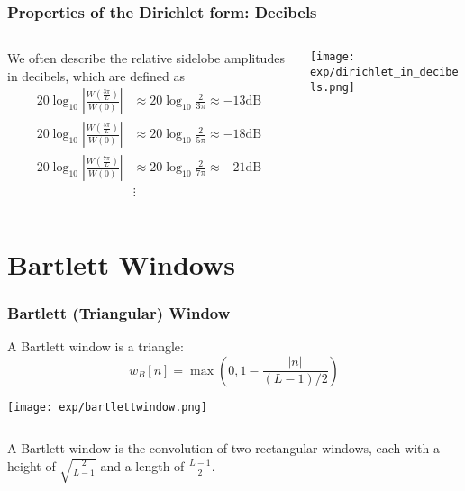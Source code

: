 \documentclass{beamer}
\begin{document}
\begin{frame}
  \frametitle{Properties of the Dirichlet form: Decibels}
  \begin{columns}
    \begin{column}{0.5\textwidth}

      We often describe the relative sidelobe amplitudes in decibels,
      which are defined as
      \begin{align*}      
        20\log_{10}\left|\frac{W\left(\frac{3\pi}{L}\right)}{W(0)}\right| &\approx
        20\log_{10}\frac{2}{3\pi}\approx -13\mbox{dB}\\
        20\log_{10}\left|\frac{W\left(\frac{5\pi}{L}\right)}{W(0)}\right| &\approx
        20\log_{10}\frac{2}{5\pi}\approx -18\mbox{dB}\\
        20\log_{10}\left|\frac{W\left(\frac{7\pi}{L}\right)}{W(0)}\right| &\approx
        20\log_{10}\frac{2}{7\pi}\approx -21\mbox{dB}\\
        & \vdots
      \end{align*}
    \end{column}
    \begin{column}{0.5\textwidth}
      \centerline{\texttt{[image: exp/dirichlet\_in\_decibels.png]}}
    \end{column}
  \end{columns}
\end{frame}

\section[Batlett]{Bartlett Windows}
\setcounter{subsection}{1}

\begin{frame}
  \frametitle{Bartlett (Triangular) Window}

  A Bartlett window is a triangle:
  \begin{displaymath}
    w_B[n] = \max\left(0,1-\frac{|n|}{(L-1)/2}\right)
  \end{displaymath}
  \begin{center}
    \texttt{[image: exp/bartlettwindow.png]}
  \end{center}
\end{frame}

\begin{frame}
  \begin{columns}
    \begin{column}{0.5\textwidth}
 
      A Bartlett window is the convolution of two rectangular windows,
      each with a height of $\sqrt{\frac{2}{L-1}}$ and a length of
      $\frac{L-1}{2}$.
    \end{column}
    \begin{column}{0.5\textwidth}
      \centerline{}
    \end{column}
  \end{columns}
\end{frame}
\end{document}
